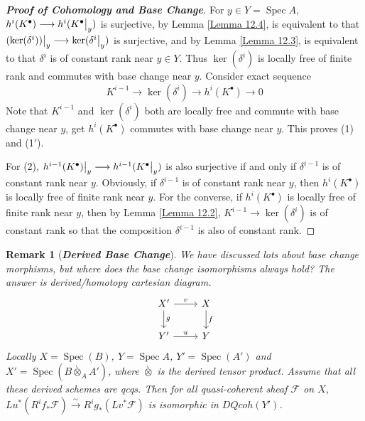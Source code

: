 \documentclass{ctexart}
\newtheorem{remark}{Remark}[section]
\newcommand{\spec}{\operatorname{Spec}}
\newcommand{\derivedotimes}{\overset{\llcorner}{\otimes}}
\begin{document}
\begin{proof}[\textbf{\emph{Proof of Cohomology and Base Change}}]
    For $y\in Y = \spec A$, $h^{i}(K^{\bullet}) \longrightarrow h^{i}(K^{\bullet}\big{|}_{y})$ is surjective,
    by Lemma \ref{Lemma 12.4}, is equivalent to that $(\ker(\delta^{i}))\big{|}_{y} \longrightarrow \ker(\delta^{i}\big{|}_{y})$ is surjective,
    and by Lemma \ref{Lemma 12.3}, is equivalent to that $\delta^{i}$ is of constant rank near $y\in Y$.
    Thus $\ker(\delta^{i})$ is locally free of finite rank and commutes with base change near $y$.
    Consider exact sequence
    \begin{equation*}
        K^{i - 1} \longrightarrow \ker(\delta^{i}) \longrightarrow h^{i}(K^{\bullet}) \longrightarrow 0
    \end{equation*}
    Note that $K^{i - 1}$ and $\ker(\delta^{i})$ both are locally free and commute with base change near $y$,
    get $h^{i}(K^{\bullet})$ commutes with base change near $y$.
    This proves (1) and (1$'$).
    \par
    For (2), $h^{i - 1}(K^{\bullet})\big{|}_{y} \longrightarrow h^{i - 1}(K^{\bullet}\big{|}_{y})$ is also surjective if and only if $\delta^{i - 1}$ is of constant rank near $y$.
    Obviously, if $\delta^{i - 1}$ is of constant rank near $y$, then $h^{i}(K^{\bullet})$ is locally free of finite rank near $y$.
    For the converse, if $h^{i}(K^{\bullet})$ is locally free of finite rank near $y$, then by Lemma \ref{Lemma 12.2}, $K^{i - 1} \longrightarrow \ker(\delta^{i})$ is of constant rank so that the composition $\delta^{i - 1}$ is also of constant rank.
\end{proof}
\begin{remark}[\textbf{\emph{Derived Base Change}}]
    We have discussed lots about base change morphisms, but where does the base change isomorphisms always hold?
    The answer is derived/homotopy cartesian diagram.
    \begin{equation*}
        \begin{tikzcd}
            X' \arrow[r, "v"] \arrow[d, "g"] &
            X \arrow[d, "f"] \\
            Y' \arrow[r, "u"] &
            Y
        \end{tikzcd}
    \end{equation*}
    Locally $X = \spec(B)$, $Y = \spec A$, $Y' = \spec(A')$ and $X' = \spec(B \derivedotimes_{A} A')$, where $\derivedotimes$ is the derived tensor product.
    Assume that all these derived schemes are qcqs.
    Then for all quasi-coherent sheaf $\mathcal{F}$ on $X$, $Lu^{\ast}(R^{i}f_{\ast}\mathcal{F}) \overset{\sim}{\longrightarrow} R^{i}g_{\ast}(Lv^{\ast}\mathcal{F})$ is isomorphic in $DQcoh(Y')$.
\end{remark}
\end{document}
